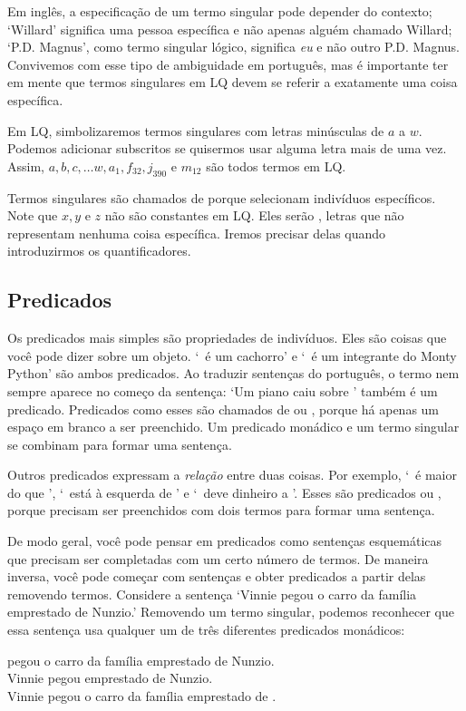 Em inglês, a especificação de um termo singular pode depender do contexto; `Willard' significa uma pessoa específica e não apenas alguém chamado Willard; `P.D. Magnus', como termo singular lógico, significa \emph{eu} e não outro P.D. Magnus. Convivemos com esse tipo de ambiguidade em português, mas é importante ter em mente que termos singulares em LQ devem se referir a exatamente uma coisa específica.

Em LQ, simbolizaremos termos singulares com letras minúsculas de $a$ a $w$. Podemos adicionar subscritos se quisermos usar alguma letra mais de uma vez. Assim, $a,b,c,\ldots w, a_1, f_{32}, j_{390}$ e $m_{12}$ são todos termos em LQ.

Termos singulares são chamados de  porque selecionam indivíduos específicos. Note que $x, y$ e $z$ não são constantes em LQ. Eles serão , letras que não representam nenhuma coisa específica. Iremos precisar delas quando introduzirmos os quantificadores.

\subsection{Predicados}
Os predicados mais simples são propriedades de indivíduos. Eles são coisas que você pode dizer sobre um objeto. `\blank\ é um cachorro' e `\blank\ é um integrante do Monty Python' são ambos predicados. Ao traduzir sentenças do português, o termo nem sempre aparece no começo da sentença: `Um piano caiu sobre \blank' também é um predicado. Predicados como esses são chamados de  ou , porque há apenas um espaço em branco a ser preenchido. Um predicado monádico e um termo singular se combinam para formar uma sentença.

Outros predicados expressam a \emph{relação} entre duas coisas. Por exemplo, `\blank\ é maior do que \blank', `\blank\ está à esquerda de \blank' e `\blank\ deve dinheiro a \blank'. Esses são predicados  ou , porque precisam ser preenchidos com dois termos para formar uma sentença.

De modo geral, você pode pensar em predicados como sentenças esquemáticas que precisam ser completadas com um certo número de termos. De maneira inversa, você pode começar com sentenças e obter predicados a partir delas removendo termos. Considere a sentença `Vinnie pegou o carro da família emprestado de Nunzio.' Removendo um termo singular, podemos reconhecer que essa sentença usa qualquer um de três diferentes predicados monádicos:
\begin{center}
\blank pegou o carro da família emprestado de Nunzio.\\
Vinnie pegou \blank emprestado de Nunzio.\\
Vinnie pegou o carro da família emprestado de \blank.
\end{center}

